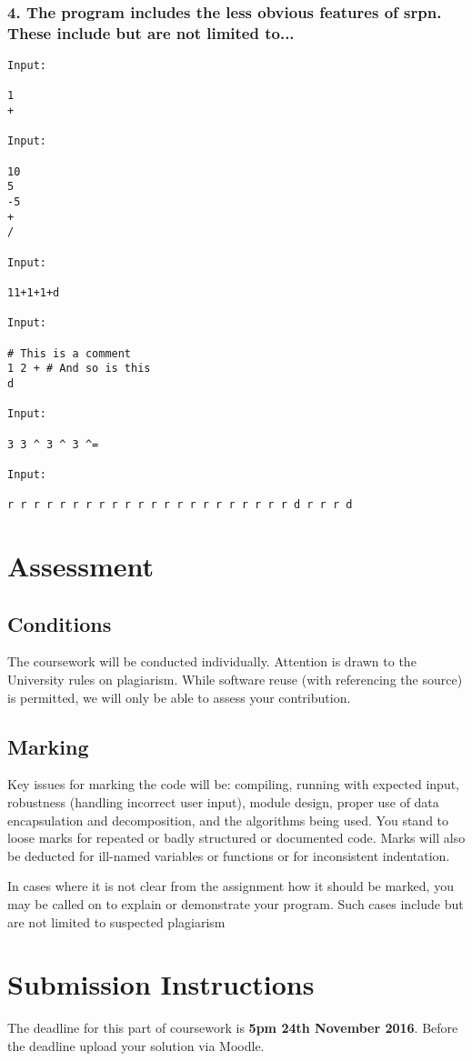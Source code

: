 \documentclass[12pt, oneside]{article}   	%
\begin{document}
\subsubsection*{4. The program includes the less obvious features of srpn. These include but are not limited to...}
\begin{lstlisting}
Input:

1 
+

Input:

10 
5 
-5
+
/

Input: 

11+1+1+d 

Input:

# This is a comment
1 2 + # And so is this 
d

Input:

3 3 ^ 3 ^ 3 ^=

Input: 

r r r r r r r r r r r r r r r r r r r r r r d r r r d
\end{lstlisting}

\clearpage
\section{Assessment}
\subsection{Conditions}
The coursework will be conducted individually. Attention is drawn to the University rules on plagiarism. While software reuse (with referencing the source) is permitted, we will only be able to assess your contribution.

\subsection{Marking}
Key issues for marking the code will be: compiling, running with expected input, robustness (handling incorrect user input), module design, proper use of data encapsulation and decomposition, and the algorithms being used. You stand to loose marks for repeated or badly structured or documented code. Marks will also be deducted for ill-named variables or functions or for inconsistent indentation.

In cases where it is not clear from the assignment how it should be marked, you may be called on to explain or demonstrate your program. Such cases include but are not limited to suspected plagiarism

\section{Submission Instructions}
The deadline for this part of coursework is \textbf{5pm 24th November 2016}. Before the deadline upload your solution via Moodle.
\end{document}
